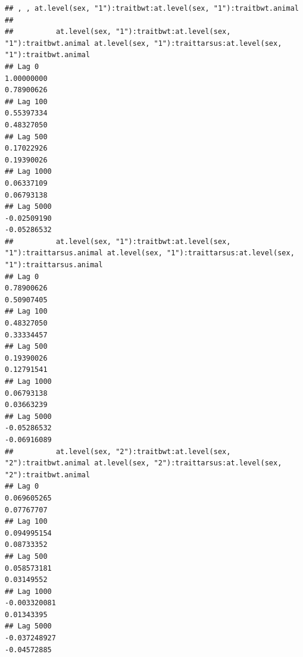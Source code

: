 \documentclass[
  12pt,
]{book}
\begin{document}
\begin{verbatim}
## , , at.level(sex, "1"):traitbwt:at.level(sex, "1"):traitbwt.animal
## 
##          at.level(sex, "1"):traitbwt:at.level(sex, "1"):traitbwt.animal at.level(sex, "1"):traittarsus:at.level(sex, "1"):traitbwt.animal
## Lag 0                                                        1.00000000                                                        0.78900626
## Lag 100                                                      0.55397334                                                        0.48327050
## Lag 500                                                      0.17022926                                                        0.19390026
## Lag 1000                                                     0.06337109                                                        0.06793138
## Lag 5000                                                    -0.02509190                                                       -0.05286532
##          at.level(sex, "1"):traitbwt:at.level(sex, "1"):traittarsus.animal at.level(sex, "1"):traittarsus:at.level(sex, "1"):traittarsus.animal
## Lag 0                                                           0.78900626                                                           0.50907405
## Lag 100                                                         0.48327050                                                           0.33334457
## Lag 500                                                         0.19390026                                                           0.12791541
## Lag 1000                                                        0.06793138                                                           0.03663239
## Lag 5000                                                       -0.05286532                                                          -0.06916089
##          at.level(sex, "2"):traitbwt:at.level(sex, "2"):traitbwt.animal at.level(sex, "2"):traittarsus:at.level(sex, "2"):traitbwt.animal
## Lag 0                                                       0.069605265                                                        0.07767707
## Lag 100                                                     0.094995154                                                        0.08733352
## Lag 500                                                     0.058573181                                                        0.03149552
## Lag 1000                                                   -0.003320081                                                        0.01343395
## Lag 5000                                                   -0.037248927                                                       -0.04572885

\end{verbatim}
\end{document}
